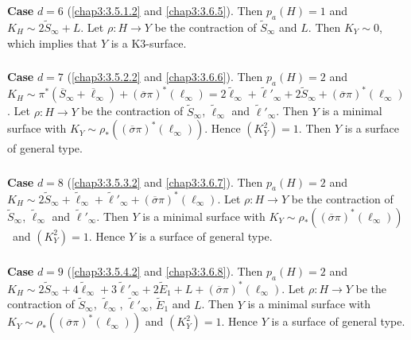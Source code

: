 \subsubsection{}\label{chap3:3.7.5}
{\bf Case} $d=6$ (\cf \ref{chap3:3.5.1.2} and \ref{chap3:3.6.5}). Then
$p_{a}(H)=1$ and $K_{H}\sim 2\widetilde{S}_{\infty}+L$. Let $\rho:H\to
Y$ be the contraction of $\widetilde{S}_{\infty}$ and $L$. Then
$K_{Y}\sim 0$, which implies that $Y$ is a K3-surface.

\subsubsection{}\label{chap3:3.7.6}
{\bf Case} $d=7$ (\cf \ref{chap3:3.5.2.2} and \ref{chap3:3.6.6}). Then
$p_{a}(H)=2$ and $K_{H}\sim
\pi^{\ast}(\overline{S}_{\infty}+\overline{\ell}_{\infty})+(\overline{\sigma}\pi)^{\ast}(\ell_{\infty})=2\widetilde{\ell}_{\infty}+\widetilde{\ell}'_{\infty}+2\widetilde{S}_{\infty}+(\overline{\sigma}\pi)^{\ast}(\ell_{\infty})$. Let
$\rho:H\to Y$ be the contraction of $\widetilde{S}_{\infty}$,
$\widetilde{\ell}_{\infty}$ and $\widetilde{\ell}'_{\infty}$. Then $Y$
is a minimal surface with $K_{Y}\sim
\rho_{\ast}((\overline{\sigma}\pi)^{\ast}(\ell_{\infty}))$. Hence
$(K^{2}_{Y})=1$. Then $Y$ is a surface of general type.

\subsubsection{}\label{chap3:3.7.7}
{\bf Case} $d=8$ (\cf \ref{chap3:3.5.3.2} and \ref{chap3:3.6.7}). Then
$p_{a}(H)=2$ and $K_{H}\sim
2\widetilde{S}_{\infty}+\widetilde{\ell}_{\infty}+\widetilde{\ell}'_{\infty}+(\overline{\sigma}\pi)^{\ast}(\ell_{\infty})$. Let
$\rho:H\to Y$ be the contraction of $\widetilde{S}_{\infty}$,
$\widetilde{\ell}_{\infty}$ and $\widetilde{\ell}'_{\infty}$. Then $Y$
is a minimal surface with $K_{Y}\sim
\rho_{\ast}((\overline{\sigma}\pi)^{\ast}(\ell_{\infty}))$\pageoriginale\
and $(K^{2}_{Y})=1$. Hence $Y$ is a surface of general type.

\subsubsection{}\label{chap3:3.7.8}
{\bf Case} $d=9$ (\cf \ref{chap3:3.5.4.2} and \ref{chap3:3.6.8}). Then
$p_{a}(H)=2$ and $K_{H}\sim
2\widetilde{S}_{\infty}+4\widetilde{\ell}_{\infty}+3\widetilde{\ell}'_{\infty}+2\widetilde{E}_{1}+L+(\overline{\sigma}\pi)^{\ast}(\ell_{\infty})$. Let
$\rho:H\to Y$ be the contraction of $\widetilde{S}_{\infty}$,
$\widetilde{\ell}_{\infty}$, $\widetilde{\ell}'_{\infty}$,
$\widetilde{E}_{1}$ and $L$. Then $Y$ is a minimal surface with
$K_{Y}\sim \rho_{\ast}((\overline{\sigma}\pi)^{\ast}(\ell_{\infty}))$
and $(K^{2}_{Y})=1$. Hence $Y$ is a surface of general type.


